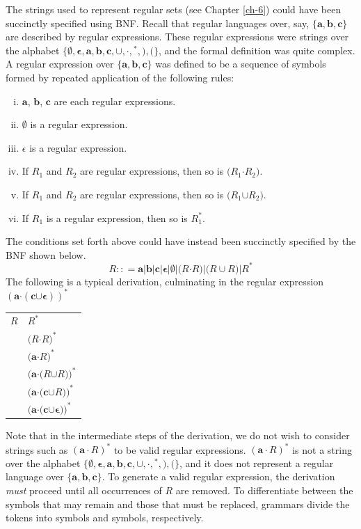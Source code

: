 The strings used to represent regular sets (see Chapter \ref{ch-6}) could have been
succinctly specified using BNF. Recall that regular languages over, say,
$\{\pmb{a},\pmb{b},\pmb{c}\}$ are described by regular expressions. These
regular expressions were strings over the alphabet $\{\pmb{\emptyset},
\pmb{\epsilon},\pmb{a},\pmb{b},\pmb{c},\pmb{\cup},\pmb{\cdot},\pmb{^*},\pmb{)},
\pmb{(}\}$, and the formal definition was quite complex. A regular expression
over $\{\pmb{a},\pmb{b},\pmb{c}\}$ was defined to be a sequence of symbols
formed by repeated application of the following rules:
\begin{enumerate}[i.]
\item $\pmb{a}$, $\pmb{b}$, $\pmb{c}$ are each regular expressions.
\item $\emptyset$ is a regular expression.
\item $\epsilon$ is a regular expression.
\item If $R_1$ and $R_2$ are regular expressions, then so is $\pmb{(}R_1 \pmb\cdot R_2\pmb{)}$.
\item If $R_1$ and $R_2$ are regular expressions, then so is $\pmb{(}R_1 \pmb\cup R_2\pmb{)}$.
\item If $R_1$ is a regular expression, then so is $R^{\pmb *}_1$.
\end{enumerate}
The conditions set forth above could have instead been succinctly specified by
the BNF shown below.
\[ R:: =\pmb{a}|\pmb{b}|\pmb{c}|\pmb{\epsilon}|\pmb{\emptyset}|\pmb{(}R\pmb{\cdot} R\pmb{)}|\pmb{(}R\cup R\pmb{)}|R^{\pmb *} \]
The following is a typical derivation, culminating in the regular expression
$\pmb{(a\pmb\cdot(c\pmb\cup\epsilon))^{\pmb *}}$
\begin{center}\begin{tabular}{r@{ $\Rightarrow$ }l}
$R$ & $R^{\pmb *}$ \\
& $\pmb{(}R \pmb\cdot R\pmb{)}^{\pmb *}$ \\
& $\pmb{(}\pmb{a} \pmb\cdot R\pmb{)}^{\pmb *}$ \\
& $\pmb{(}\pmb{a}\pmb\cdot\pmb{(}R \pmb\cup R\pmb{)}\pmb{)}^{\pmb *}$ \\
& $\pmb{(}\pmb{a}\pmb\cdot\pmb{(}\pmb{c}\pmb\cup R\pmb{)}\pmb{)}^{\pmb *}$ \\
& $\pmb{(}\pmb{a}\pmb\cdot\pmb{(}\pmb{c}\pmb\cup\pmb{\epsilon}\pmb{)}\pmb{)}^{\pmb *}$
\end{tabular}\end{center}
Note that in the intermediate steps of the derivation, we do not wish to consider
strings such as $(\pmb{a}\cdot R)^*$ to be valid regular expressions. $(\pmb{a}
\cdot R)^*$ is not a string over the alphabet $\{\pmb{\emptyset},\pmb{\epsilon},
\pmb{a},\pmb{b},\pmb{c},\pmb{\cup},\pmb{\cdot},\pmb{^*},\pmb{)},\pmb{(}\}$, and
it does not represent a regular language over $\{\pmb{a},\pmb{b},\pmb{c}\}$. To
generate a valid regular expression, the derivation \emph{must} proceed until
all occurrences of $R$ are removed. To differentiate between the symbols that
may remain and those that must be replaced, grammars divide the tokens into
\emph{} symbols and \emph{} symbols,
respectively.


